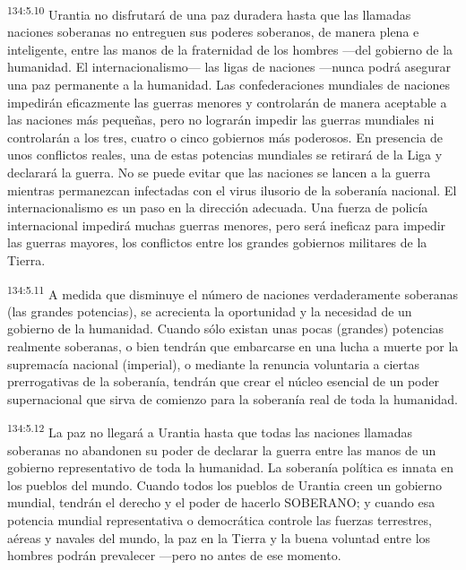 \par
\textsuperscript{134:5.10} Urantia no disfrutará de una paz duradera hasta que las llamadas naciones soberanas no entreguen sus poderes soberanos, de manera plena e inteligente, entre las manos de la fraternidad de los hombres ---del gobierno de la humanidad. El internacionalismo--- las ligas de naciones ---nunca podrá asegurar una paz permanente a la humanidad. Las confederaciones mundiales de naciones impedirán eficazmente las guerras menores y controlarán de manera aceptable a las naciones más pequeñas, pero no lograrán impedir las guerras mundiales ni controlarán a los tres, cuatro o cinco gobiernos más poderosos. En presencia de unos conflictos reales, una de estas potencias mundiales se retirará de la Liga y declarará la guerra. No se puede evitar que las naciones se lancen a la guerra mientras permanezcan infectadas con el virus ilusorio de la soberanía nacional. El internacionalismo es un paso en la dirección adecuada. Una fuerza de policía internacional impedirá muchas guerras menores, pero será ineficaz para impedir las guerras mayores, los conflictos entre los grandes gobiernos militares de la Tierra.

\par
\textsuperscript{134:5.11} A medida que disminuye el número de naciones verdaderamente soberanas (las grandes potencias), se acrecienta la oportunidad y la necesidad de un gobierno de la humanidad. Cuando sólo existan unas pocas (grandes) potencias realmente soberanas, o bien tendrán que embarcarse en una lucha a muerte por la supremacía nacional (imperial), o mediante la renuncia voluntaria a ciertas prerrogativas de la soberanía, tendrán que crear el núcleo esencial de un poder supernacional que sirva de comienzo para la soberanía real de toda la humanidad.

\par
\textsuperscript{134:5.12} La paz no llegará a Urantia hasta que todas las naciones llamadas soberanas no abandonen su poder de declarar la guerra entre las manos de un gobierno representativo de toda la humanidad. La soberanía política es innata en los pueblos del mundo. Cuando todos los pueblos de Urantia creen un gobierno mundial, tendrán el derecho y el poder de hacerlo SOBERANO; y cuando esa potencia mundial representativa o democrática controle las fuerzas terrestres, aéreas y navales del mundo, la paz en la Tierra y la buena voluntad entre los hombres podrán prevalecer ---pero no antes de ese momento.

